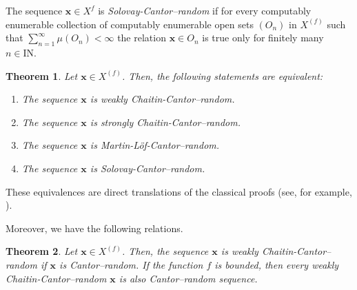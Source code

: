 \documentclass[11pt,a4paper,twoside]{article}
\newcommand{\x}{{\mathbf x}}
\def \bbbn {\mathrm{I\!N}} %
\def \XF  {X^{(f)}}
\newtheorem{theo}{Theorem}
\begin{document}
The sequence $\x \in X^{f}$ is {\it Solovay-Cantor--random} if   for every
computably enumerable collection of computably enumerable open sets $(O_n)$
in $\XF$ such that $\sum_{n=1}^{\infty}\mu (O_n) < \infty$ the relation  $\x
\in  O_n$ is true only for finitely many $n\in\bbbn$.




\begin{theo}
Let $\x \in\XF$. Then, the following statements are equivalent:
\begin{enumerate}
\item The sequence $\x$ is
weakly Chaitin-Cantor--random.
\item The sequence $\x$ is strongly Chaitin-Cantor--random.
\item The sequence $\x$ is
Martin-L\" of-Cantor--random.
\item The sequence $\x$ is Solovay-Cantor--random.
\end{enumerate}
\end{theo}
These equivalences are direct translations of the classical proofs
 (see, for example, \cite{Ca}).

Moreover, we have the following relations.
\begin{theo}
Let $\x \in\XF$. Then, the sequence $\x$ is weakly
Chaitin-Cantor--random if $\x$ is Cantor--random.  If the function $f$
is bounded, then every  weakly
Chaitin-Cantor--random $\x$ is also Cantor--random sequence.
\end{theo}
\end{document}
